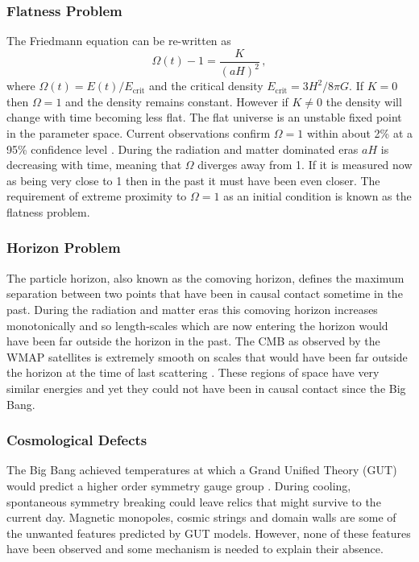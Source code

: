 \subsubsection{Flatness Problem} 
\label{sec:flatprob}
The Friedmann equation
 can be re-written as
% 
\begin{equation}
\label{eq:omegadefn-intro}
\Omega(t) - 1 = \frac{K}{(aH)^2} \,,
\end{equation}
% 
where $\Omega(t)=E(t)/E_\mathrm{crit}$ and the critical density
$E_\mathrm{crit}= 3H^2/8\pi G$. 
If $K=0$ then $\Omega=1$ and the density remains constant. However if
$K\neq0$ the density will change with time becoming less flat. The flat universe
is an
unstable fixed point in the parameter space.
Current observations confirm $\Omega=1$ within about 2\% at a 95\% confidence
level \cite{Komatsu:2008hk}.
During the radiation and matter dominated eras $aH$ is decreasing with time,
meaning that $\Omega$ diverges away from 1. If it is measured now as being very
close to 1 then in the past it must have been even closer. The requirement of
extreme proximity to $\Omega=1$ as an initial condition is known as the
flatness problem. 


\subsubsection{Horizon Problem} \label{sec:horizprob}
The particle horizon, also known
as the comoving horizon, defines the maximum separation between two points that
have been in causal contact sometime in the past. During the radiation and
matter eras this comoving horizon increases monotonically and so length-scales
which are now entering the horizon would have been far outside the horizon in
the past. 
The CMB as observed by the WMAP satellites is extremely smooth on scales that
would have been far outside the horizon at the time of last scattering
\cite{Komatsu:2008hk}. These regions of space have very similar energies and
yet they could not have been in causal contact since the Big Bang. 


\subsubsection{Cosmological Defects} \label{sec:cosdefects}
The Big Bang achieved temperatures at which a Grand Unified Theory
(GUT) would predict a higher order symmetry gauge group \cite{book:kolbturner}.
During cooling,
spontaneous symmetry breaking could leave relics that might survive to
the current day. Magnetic monopoles, cosmic strings and domain walls are some of
the unwanted features predicted by GUT models. However, none of these features
have been observed and some mechanism is needed to explain their absence.




